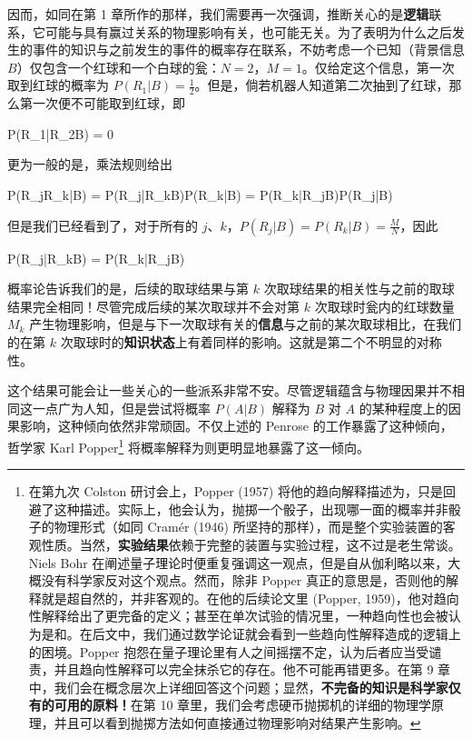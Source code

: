 因而，如同在第 1 章所作的那样，我们需要再一次强调，推断关心的是{\bf 逻辑}联系，它可能与具有赢过关系的物理影响有关，也可能无关。为了表明为什么之后发生的事件的知识与之前发生的事件的概率存在联系，不妨考虑一个已知（背景信息 $B$）仅包含一个红球和一个白球的瓮：$N = 2$，$M = 1$。仅给定这个信息，第一次取到红球的概率为 $P(R_1|B) = \frac{1}{2}$。但是，倘若机器人知道第二次抽到了红球，那么第一次便不可能取到红球，即

\placeformula[3-38]
\startformula
P(R_1|R_2B) = 0
\stopformula

更为一般的是，乘法规则给出

\placeformula[3-39]
\startformula
P(R_jR_k|B) = P(R_j|R_kB)P(R_k|B) = P(R_k|R_jB)P(R_j|B)
\stopformula

但是我们已经看到了，对于所有的 $j$、$k$，$P(R_j|B) = P(R_k|B) = \frac{M}{N}$，因此

\placeformula[3-40]
\startformula
P(R_j|R_kB) = P(R_k|R_jB)
\stopformula

概率论告诉我们的是，后续的取球结果与第 $k$ 次取球结果的相关性与之前的取球结果完全相同！尽管完成后续的某次取球并不会对第 $k$ 次取球时瓮内的红球数量 $M_k$ 产生物理影响，但是与下一次取球有关的{\bf 信息}与之前的某次取球相比，在我们的在第 $k$ 次取球时的{\bf 知识状态}上有着同样的影响。这就是第二个不明显的对称性。

这个结果可能会让一些关心的一些派系非常不安。尽管逻辑蕴含与物理因果并不相同这一点广为人知，但是尝试将概率 $P(A|B)$ 解释为 $B$ 对 $A$ 的某种程度上的因果影响，这种倾向依然非常顽固。不仅上述的 Penrose 的工作暴露了这种倾向，哲学家 Karl Popper\footnote{在第九次 Colston 研讨会上，Popper (1957) 将他的趋向解释描述为，只是回避了这种描述。实际上，他会认为，抛掷一个骰子，出现哪一面的概率并非骰子的物理形式（如同 Cram\'er (1946) 所坚持的那样），而是整个实验装置的客观性质。当然，{\bf 实验结果}依赖于完整的装置与实验过程，这不过是老生常谈。Niels Bohr 在阐述量子理论时便重复强调这一观点，但是自从伽利略以来，大概没有科学家反对这个观点。然而，除非 Popper 真正的意思是，否则他的解释就是超自然的，并非客观的。在他的后续论文里 (Popper, 1959)，他对趋向性解释给出了更完备的定义；甚至在单次试验的情况里，一种趋向性也会被认为是和。在后文中，我们通过数学论证就会看到一些趋向性解释造成的逻辑上的困境。Popper 抱怨在量子理论里有人之间摇摆不定，认为后者应当受谴责，并且趋向性解释可以完全抹杀它的存在。他不可能再错更多。在第 9 章中，我们会在概念层次上详细回答这个问题；显然，{\bf 不完备的知识是科学家仅有的可用的原料！}在第 10 章里，我们会考虑硬币抛掷机的详细的物理学原理，并且可以看到抛掷方法如何直接通过物理影响对结果产生影响。} 将概率解释为则更明显地暴露了这一倾向。

